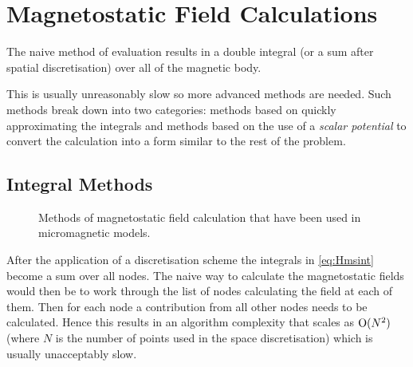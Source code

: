 \section{Magnetostatic Field Calculations}

The naive method of evaluation results in a double integral (or a sum after spatial discretisation) over all of the magnetic body. 

This is usually unreasonably slow so more advanced methods are needed. Such methods break down into two categories: methods based on quickly approximating the integrals and methods based on the use of a \emph{scalar potential} to convert the calculation into a form similar to the rest of the problem.

\subsection{Integral Methods}
\label{sec:magstat-field-calc-inte}

\begin{figure}
  \centering
  \caption{Methods of magnetostatic field calculation that have been used in micromagnetic models.}
  \label{fig:types-mag-stat}
\end{figure}

After the application of a discretisation scheme the integrals in \eqref{eq:Hmsint} become a sum over all nodes.
The naive way to calculate the magnetostatic fields would then be to work through the list of nodes calculating the field at each of them.
Then for each node a contribution from all other nodes needs to be calculated. Hence this results in an algorithm complexity that scales as $\text{O}(N^2)$ (where $N$ is the number of points used in the space discretisation) which is usually unacceptably slow.

